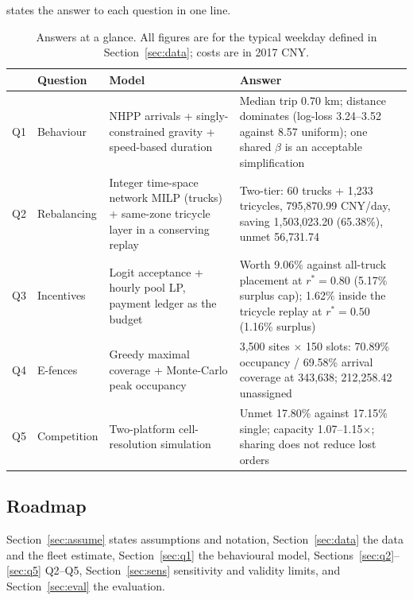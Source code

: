  states the answer to each question in one line.

\begin{table}[htbp]
\centering
\footnotesize
\caption[Answers at a glance]{Answers at a glance. All figures are for the typical weekday defined in
Section~\ref{sec:data}; costs are in 2017 CNY.}
\label{tab:answers}
\footnotesize
\begin{tabular}{@{}p{0.7cm}p{4.1cm}p{5.0cm}p{4.6cm}@{}}
\toprule
 & \textbf{Question} & \textbf{Model} & \textbf{Answer} \\
\midrule
Q1 & Behaviour & NHPP arrivals + singly-constrained gravity + speed-based duration & Median trip 0.70 km; distance dominates (log-loss 3.24--3.52 against 8.57 uniform); one shared $\beta$ is an acceptable simplification \\
Q2 & Rebalancing & Integer time-space network MILP (trucks) + same-zone tricycle layer in a conserving replay & Two-tier: 60 trucks + 1{,}233 tricycles, 795{,}870.99 CNY/day, saving 1{,}503{,}023.20 (65.38\%), unmet 56{,}731.74 \\
Q3 & Incentives & Logit acceptance + hourly pool LP, payment ledger as the budget & Worth 9.06\% against all-truck placement at $r^*=0.80$ (5.17\% surplus cap); 1.62\% inside the tricycle replay at $r^*=0.50$ (1.16\% surplus) \\
Q4 & E-fences & Greedy maximal coverage + Monte-Carlo peak occupancy & 3{,}500 sites $\times$ 150 slots: 70.89\% occupancy / 69.58\% arrival coverage at 343{,}638; 212{,}258.42 unassigned \\
Q5 & Competition & Two-platform cell-resolution simulation & Unmet 17.80\% against 17.15\% single; capacity 1.07--1.15$\times$; sharing does not reduce lost orders \\
\bottomrule
\end{tabular}
\end{table}

\subsection{Roadmap}

Section~\ref{sec:assume} states assumptions and notation, Section~\ref{sec:data}
the data and the fleet estimate, Section~\ref{sec:q1} the behavioural model,
Sections~\ref{sec:q2}--\ref{sec:q5} Q2--Q5, Section~\ref{sec:sens} sensitivity and
validity limits, and Section~\ref{sec:eval} the evaluation.

